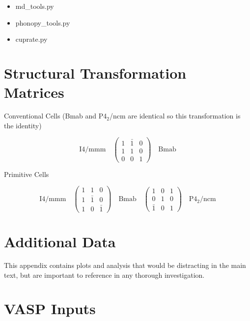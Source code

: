 \begin{itemize}
    \item md\_tools.py
    \item phonopy\_tools.py
    \item cuprate.py
\end{itemize}

\chapter{Structural Transformation Matrices}

Conventional Cells (Bmab and P4$_2$/ncm are identical so this transformation is the identity)

\[
\text{I4/mmm} \quad 
\begin{pmatrix}
1 & \bar{1} & 0 \\
1 & 1 & 0 \\
0 & 0 & 1
\end{pmatrix}
\quad \text{Bmab}
\]

\noindent Primitive Cells

\[
\text{I4/mmm} \quad 
\begin{pmatrix}
1 & 1 & 0 \\
1 & \bar{1} & 0 \\
1 & 0 & \bar{1}
\end{pmatrix}
\quad \text{Bmab} \quad
\begin{pmatrix}
1 & 0 & 1 \\
0 & 1 & 0 \\
\bar{1} & 0 & 1
\end{pmatrix} 
\quad \text{P4}_2\text{/ncm}
\]

\chapter{Additional Data}
This appendix contains plots and analysis that would be distracting in the main text, but are important to reference in any thorough investigation.

\chapter{VASP Inputs}\label{app:vasp}

